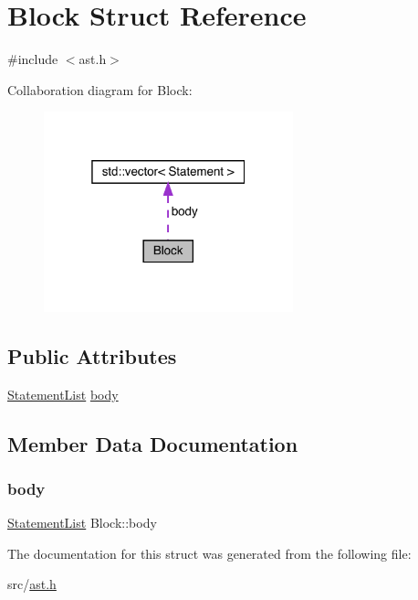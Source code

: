 \hypertarget{struct_block}{}\section{Block Struct Reference}
\label{struct_block}


{\ttfamily \#include $<$ast.\+h$>$}



Collaboration diagram for Block\+:\nopagebreak
\begin{figure}[H]
\begin{center}
\leavevmode
\includegraphics[width=205pt]{struct_block__coll__graph}
\end{center}
\end{figure}
\subsection*{Public Attributes}
\begin{DoxyCompactItemize}
\item 
\hyperlink{ast_8h_af5d265e5ec7c64e6aedeafa391d8cc47}{Statement\+List} \hyperlink{struct_block_a8f6ef40a63c57c19abb983185454cae4}{body}
\end{DoxyCompactItemize}


\subsection{Member Data Documentation}
\mbox{\label{struct_block_a8f6ef40a63c57c19abb983185454cae4}} 
\subsubsection{\texorpdfstring{body}{body}}
{\footnotesize\ttfamily \hyperlink{ast_8h_af5d265e5ec7c64e6aedeafa391d8cc47}{Statement\+List} Block\+::body}



The documentation for this struct was generated from the following file\+:\begin{DoxyCompactItemize}
\item 
src/\hyperlink{ast_8h}{ast.\+h}\end{DoxyCompactItemize}
